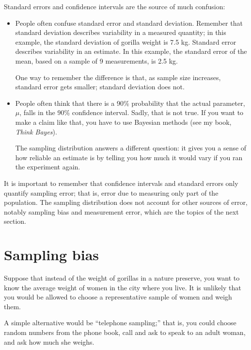 \documentclass[12pt]{book}
\begin{document}
Standard errors and confidence intervals are the source of much confusion:

\begin{itemize}

\item People often confuse standard error and standard deviation.
  Remember that standard deviation describes variability in a measured
  quantity; in this example, the standard deviation of gorilla weight
  is 7.5 kg.  Standard error describes variability in an estimate.  In
  this example, the standard error of the mean, based on a sample of 9
  measurements, is 2.5 kg.

  One way to remember the difference is that, as sample size
  increases, standard error gets smaller; standard deviation does not.

\item People often think that there is a 90\% probability that the
  actual parameter, $\mu$, falls in the 90\% confidence interval.
  Sadly, that is not true.  If you want to make a claim like that, you
  have to use Bayesian methods (see my book, {\it Think Bayes\/}).

  The sampling distribution answers a different question: it gives you
  a sense of how reliable an estimate is by telling you how much it
  would vary if you ran the experiment again.

\end{itemize}

It is important to remember that confidence intervals
and standard errors only quantify sampling error; that is,
error due to measuring only part of the population.
The sampling distribution does not account for other
sources of error, notably sampling bias and measurement error, 
which are the topics of the next section.


\section{Sampling bias}

Suppose that instead of the weight of gorillas in a nature preserve,
you want to know the average weight of women in the city where you
live.  It is unlikely that you would be allowed
to choose a representative sample of women and
weigh them.

A simple alternative would be
``telephone sampling;'' that is,
you could choose random numbers from the phone book, call and ask to
speak to an adult woman, and ask how much she weighs.
\end{document}
